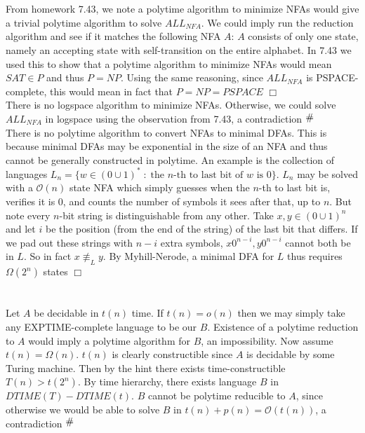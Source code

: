 \documentclass{article}
\newcommand{\contra}{\raisebox{\depth}{\#}}
\begin{document}
\section{}
From homework 7.43, we note a polytime algorithm to minimize NFAs would give a trivial polytime algorithm to solve $ALL_{NFA}$. We could imply run the reduction algorithm and see if it matches the following NFA $A$: $A$ consists of only one state, namely an accepting state with self-transition on the entire alphabet. In 7.43 we used this to show that a polytime algorithm to minimize NFAs would mean $SAT \in P$ and thus $P = NP$. Using the same reasoning, since $ALL_{NFA}$ is PSPACE-complete, this would mean in fact that $P = NP = PSPACE$ $\Box$\\
There is no logspace algorithm to minimize NFAs. Otherwise, we could solve $ALL_{NFA}$ in logspace using the observation from 7.43, a contradiction $\contra$\\
There is no polytime algorithm to convert NFAs to minimal DFAs. This is because minimal DFAs may be exponential in the size of an NFA and thus cannot be generally constructed in polytime. An example is the collection of languages $L_n = \{ w \in (0\cup1)^* \;:\; \text{the }n\text{-th to last bit of }w\text{ is 0}\}$. $L_n$ may be solved with a $\mathcal{O}(n)$ state NFA which simply guesses when the $n$-th to last bit is, verifies it is 0, and counts the number of symbols it sees after that, up to $n$. But note every $n$-bit string is distinguishable from any other. Take $x,y \in (0\cup1)^n$ and let $i$ be the position (from the end of the string) of the last bit that differs. If we pad out these strings with $n-i$ extra symbols, $x0^{n-i}, y0^{n-i}$ cannot both be in $L$. So in fact $x \not\equiv_L y$. By Myhill-Nerode, a minimal DFA for $L$ thus requires $\Omega(2^n)$ states $\Box$

\section{}
Let $A$ be decidable in $t(n)$ time. If $t(n) = o(n)$ then we may simply take any EXPTIME-complete language to be our $B$. Existence of a polytime reduction to $A$ would imply a polytime algorithm for $B$, an impossibility. Now assume $t(n) = \Omega(n)$. $t(n)$ is clearly constructible since $A$ is decidable by some Turing machine. Then by the hint there exists time-constructible $T(n) > t(2^n)$. By time hierarchy, there exists language $B$ in $DTIME(T) - DTIME(t)$. $B$ cannot be polytime reducible to $A$, since otherwise we would be able to solve $B$ in $t(n) + p(n) = \mathcal{O}(t(n))$, a contradiction $\contra$
\end{document}
